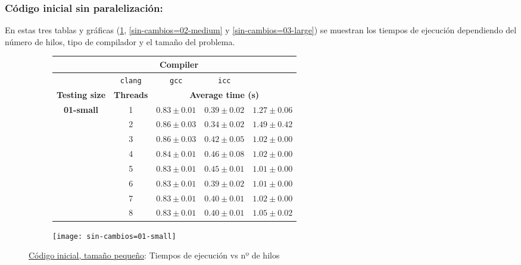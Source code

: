 
\subsubsection{\textbf{Código inicial sin paralelización:}}

\par En estas tres tablas y gráficas (\ref{fig:sin-cambios=01-small}, \ref{sin-cambios=02-medium} y \ref{sin-cambios=03-large}) se muestran los tiempos de ejecución dependiendo del número de hilos,
 tipo de compilador y el tamaño del problema.


\begin{figure}[H]
    \centering
    \begin{subfigure}{0.4\textwidth}
        \begin{adjustbox}{width=\textwidth} 
        \begin{tabular}{|c|c|c|c|c|}
            \hline
            \rowcolor{azul} \multicolumn{2}{|c|}{}&\multicolumn{3}{c|}{\textbf{Compiler}} \\ \hline
            \rowcolor{azul} \multicolumn{2}{|c|}{}&\texttt{clang}&\texttt{gcc}&\texttt{icc}\\ \hline
            \rowcolor{azul} \textbf{Testing size} & \textbf{Threads}&\multicolumn{3}{c|}{\textbf{Average time (s)}} \\ \hline
            \multirow{8}{1cm}{\textbf{01-small}} & 1 & \(0.83\pm{0.01}\) & \(0.39\pm{0.02}\) & \(1.27\pm{0.06}\) \\ \cline{2-5}
            & 2 & \(0.86\pm{0.03}\) & \(0.34\pm{0.02}\) & \(1.49\pm{0.42}\) \\ \cline{2-5}
            & 3 & \(0.86\pm{0.03}\) & \(0.42\pm{0.05}\) & \(1.02\pm{0.00}\) \\ \cline{2-5}
            & 4 & \(0.84\pm{0.01}\) & \(0.46\pm{0.08}\) & \(1.02\pm{0.00}\) \\ \cline{2-5}
            & 5 & \(0.83\pm{0.01}\) & \(0.45\pm{0.01}\) & \(1.01\pm{0.00}\) \\ \cline{2-5}
            & 6 & \(0.83\pm{0.01}\) & \(0.39\pm{0.02}\) & \(1.01\pm{0.00}\) \\ \cline{2-5}
            & 7 & \(0.83\pm{0.01}\) & \(0.40\pm{0.01}\) & \(1.02\pm{0.00}\) \\ \cline{2-5}
            & 8 & \(0.83\pm{0.01}\) & \(0.40\pm{0.01}\) & \(1.05\pm{0.02}\) \\ \hline
        \end{tabular}
        \end{adjustbox}
    \end{subfigure}
    \hfill
    \begin{subfigure}{0.5\textwidth}
        \texttt{[image: sin-cambios=01-small]}
    \end{subfigure}
    \caption{\underline{Código inicial, tamaño pequeño}: Tiempos de ejecución vs nº de hilos}
    \label{fig:sin-cambios=01-small}
\end{figure}

